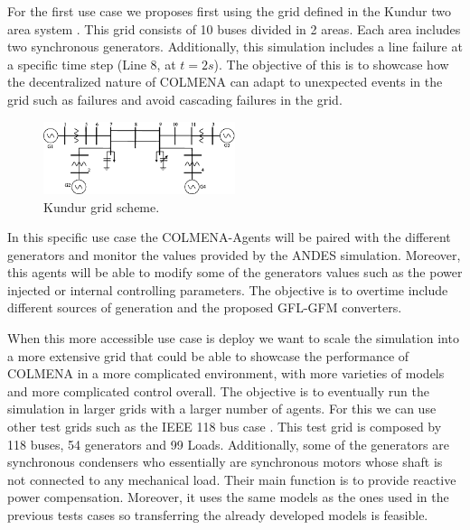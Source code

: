 \documentclass{article}
\begin{document}
For the first use case we proposes first using the grid defined in  the Kundur two area system  \cite{grids:kundur}. This grid consists of 10 buses divided in 2 areas. Each area includes two synchronous generators. Additionally, this simulation includes a line failure at a specific time step (Line 8, at $t=2s$). The objective of this is to showcase how the decentralized nature of COLMENA can adapt to unexpected events in the grid such as failures and avoid cascading failures in the grid. 

\begin{figure}[!htb]
    \centering
    \includegraphics[width=0.5\textwidth]{pictures/kundurgrid.png}
    \caption{Kundur grid scheme. \cite{grids:kundur}}
    \label{fig:kundur2}
\end{figure}

In this specific use case the COLMENA-Agents will be paired with the different generators and monitor the values provided by the ANDES simulation. Moreover, this agents will be able to modify some of the generators values such as the power injected or internal controlling parameters. The objective is to overtime include different sources of generation and the proposed GFL-GFM converters. 

When this more accessible use case is deploy we want to scale the simulation into a more extensive grid that could be able to showcase the performance of COLMENA in a more complicated environment, with more varieties of models and more complicated control overall. The objective is to eventually run the simulation in larger grids with a larger number of agents. For this we can use other test grids such as the IEEE 118 bus case \cite{grids:ieee118}. This test grid is composed by 118 buses, 54 generators and 99 Loads. Additionally, some of the generators are synchronous condensers who essentially are synchronous motors whose shaft is not connected to any mechanical load. Their main function is to provide reactive power compensation. Moreover, it uses the same models as the ones used in the previous tests cases so transferring the already developed models is feasible.
\end{document}

